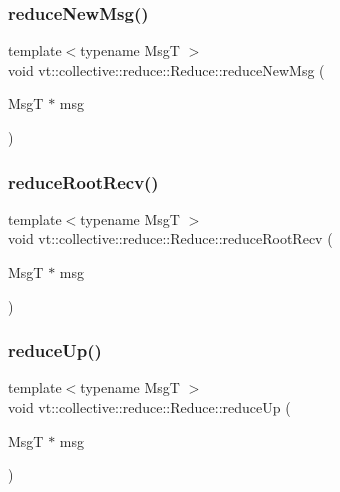 \subsubsection{\texorpdfstring{reduce\+New\+Msg()}{reduceNewMsg()}}
{\footnotesize\ttfamily template$<$typename MsgT $>$ \\
void vt\+::collective\+::reduce\+::\+Reduce\+::reduce\+New\+Msg (\begin{DoxyParamCaption}\item[{MsgT $\ast$}]{msg }\end{DoxyParamCaption})}

\mbox{\label{structvt_1_1collective_1_1reduce_1_1_reduce_a48c7bb604fade1b64b9b391f4091ad5b}} 
\subsubsection{\texorpdfstring{reduce\+Root\+Recv()}{reduceRootRecv()}}
{\footnotesize\ttfamily template$<$typename MsgT $>$ \\
void vt\+::collective\+::reduce\+::\+Reduce\+::reduce\+Root\+Recv (\begin{DoxyParamCaption}\item[{MsgT $\ast$}]{msg }\end{DoxyParamCaption})}

\mbox{\label{structvt_1_1collective_1_1reduce_1_1_reduce_a2bae42586b143c42c731bcd9c96d4426}} 
\subsubsection{\texorpdfstring{reduce\+Up()}{reduceUp()}}
{\footnotesize\ttfamily template$<$typename MsgT $>$ \\
void vt\+::collective\+::reduce\+::\+Reduce\+::reduce\+Up (\begin{DoxyParamCaption}\item[{MsgT $\ast$}]{msg }\end{DoxyParamCaption})}

